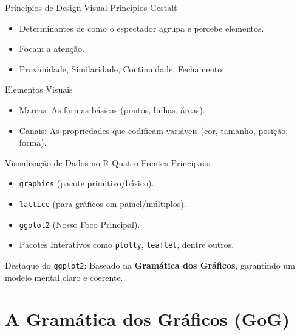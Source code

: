 \documentclass[
  ignorenonframetext,
  serif,
  professionalfont,
  usenames,
  dvipsnames,
  aspectratio = 169]{beamer}
\begin{document}
\begin{frame}{Princípios de Design Visual}
\label{princuxedpios-de-design-visual}
Princípios Gestalt

\begin{itemize}
\item
  Determinantes de como o espectador agrupa e percebe elementos.
\item
  Focam a atenção.
\item
  Proximidade, Similaridade, Continuidade, Fechamento.
\end{itemize}

\vspace{0.3cm}

Elementos Visuais

\begin{itemize}
\item
  Marcas: As formas básicas (pontos, linhas, áreas).
\item
  Canais: As propriedades que codificam variáveis (cor, tamanho,
  posição, forma).
\end{itemize}
\end{frame}

\begin{frame}[fragile]{Visualização de Dados no R}
\label{visualizauxe7uxe3o-de-dados-no-r}
Quatro Frentes Principais:

\begin{itemize}
\item
  \texttt{graphics} (pacote primitivo/básico).
\item
  \texttt{lattice} (para gráficos em painel/múltiplos).
\item
  \texttt{ggplot2} (Nosso Foco Principal).
\item
  Pacotes Interativos como \texttt{plotly}, \texttt{leaflet}, dentre
  outros.
\end{itemize}

\vspace{0.3cm}

Destaque do \texttt{ggplot2}: Baseado na \textbf{Gramática dos
Gráficos}, garantindo um modelo mental claro e coerente.
\end{frame}

\section{A Gramática dos Gráficos
(GoG)}\label{a-gramuxe1tica-dos-gruxe1ficos-gog}
\end{document}
